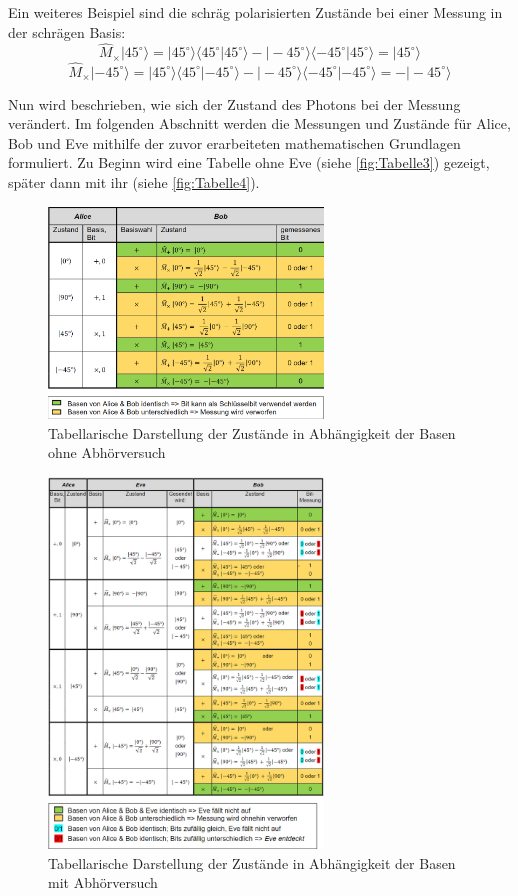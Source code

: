 Ein weiteres Beispiel sind die schräg polarisierten Zustände bei einer Messung in der schrägen Basis:
\[
\hat{M}_\times |45^\circ \rangle = |45^\circ \rangle \langle 45^\circ | 45^\circ \rangle - |-45^\circ \rangle \langle -45^\circ | 45^\circ \rangle = |45^\circ \rangle
\]
\[
\hat{M}_\times |-45^\circ \rangle = |45^\circ \rangle \langle 45^\circ | -45^\circ \rangle - |-45^\circ \rangle \langle -45^\circ | -45^\circ \rangle = -|-45^\circ \rangle
\]

Nun wird beschrieben, wie sich der Zustand des Photons bei der Messung verändert. Im folgenden Abschnitt werden die Messungen und Zustände für Alice, Bob und Eve mithilfe der zuvor erarbeiteten mathematischen Grundlagen formuliert. Zu Beginn wird eine Tabelle ohne Eve (siehe \autoref{fig:Tabelle3}) gezeigt, später dann mit ihr (siehe \autoref{fig:Tabelle4}).


\begin{figure}[H]
	\centering
	\includegraphics[width=0.65\textwidth]{content/grafik/Tabelle3.png}
	\caption{Tabellarische Darstellung der Zustände in Abhängigkeit der Basen ohne Abhörversuch\cite{krypt}}
	\label{fig:Tabelle3}
\end{figure}

\begin{figure}[H]
	\centering
	\includegraphics[width=0.65\textwidth]{content/grafik/Tabelle4.png}
	\caption{Tabellarische Darstellung der Zustände in Abhängigkeit der Basen mit Abhörversuch\cite{krypt}}
	\label{fig:Tabelle3}
\end{figure}
